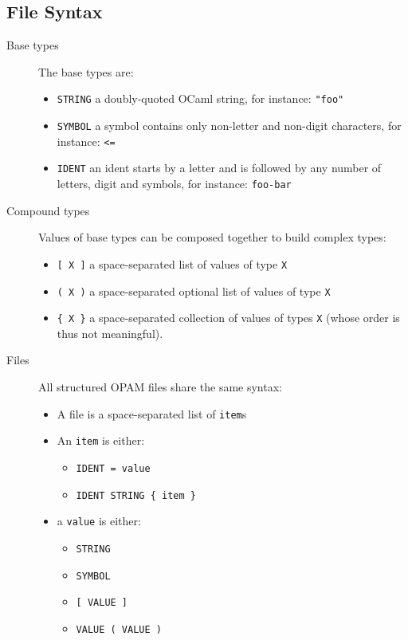 \documentclass[a4paper,11pt]{article}
\begin{document}
\subsection{File Syntax}
\label{syntax}

\begin{description}

\item[Base types] The base types are:

\begin{itemize}
\item {\tt STRING} a doubly-quoted OCaml string, for instance: {\tt "foo"}
\item {\tt SYMBOL} a symbol contains only non-letter and non-digit
  characters, for instance: {\tt <=}
\item {\tt IDENT} an ident starts by a letter and is followed by any
  number of letters, digit and symbols, for instance: {\tt foo-bar}
\end{itemize}

\item[Compound types] Values of base types can be composed together to
  build complex types:

\begin{itemize}
\item {\tt [ X ]} a space-separated list of values of type {\tt X}
\item {\tt ( X )} a space-separated optional list of values of type
  {\tt X}
\item \verb+{ X }+ a space-separated collection of values of types
      {\tt X} (whose order is thus not meaningful).
\end{itemize}

\item[Files] All structured OPAM files share the same syntax:

\begin{itemize}

\item A file is a space-separated list of {\tt item}s

\item An {\tt item} is either:
\begin{itemize}
\item {\tt IDENT = value}
\item \verb+IDENT STRING { item }+
\end{itemize}

\item a {\tt value} is either:
\begin{itemize}
\item {\tt STRING}
\item {\tt SYMBOL}
\item {\tt [ VALUE ]}
\item \verb+VALUE ( VALUE )+
\end{itemize}

\end{itemize}
\end{description}
\end{document}

